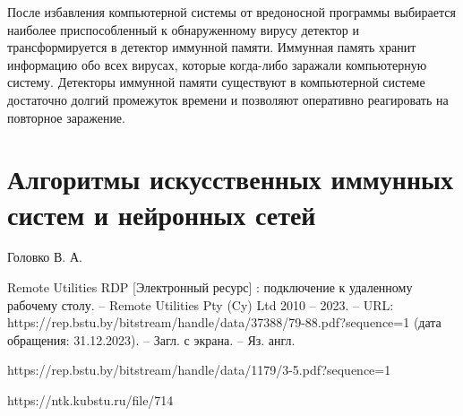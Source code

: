 \documentclass[bachelor, och, referat]{template}
\begin{document}
После избавления компьютерной системы от вредоносной программы
выбирается наиболее приспособленный к обнаруженному вирусу детек­тор 
и трансформируется в детектор иммунной памяти. Иммунная память
хранит информацию обо всех вирусах, которые когда-либо заражали 
ком­пьютерную систему. Детекторы иммунной памяти существуют в 
компью­терной системе достаточно долгий промежуток времени и позволяют 
опе­ративно реагировать на повторное заражение.






\section{Алгоритмы искусственных иммунных систем и нейронных сетей}


\begin{thebibliography}{15}
    Головко В. А. 

    Remote Utilities RDP [Электронный ресурс] : подключение к удаленному рабочему столу. --  
    Remote Utilities Pty (Cy) Ltd 2010 -- 2023. -- URL:  https://rep.bstu.by/bitstream/handle/data/37388/79-88.pdf?sequence=1 (дата обращения: 31.12.2023). -- Загл. с экрана. -- Яз. англ.
    
    https://rep.bstu.by/bitstream/handle/data/1179/3-5.pdf?sequence=1

    https://ntk.kubstu.ru/file/714


\end{thebibliography}
\end{document}

